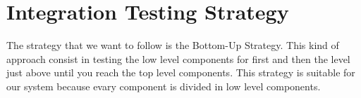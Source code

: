 \documentclass[../../../../testPlan.tex]{subfiles}
\begin{document}
	\section{Integration Testing Strategy}
		The strategy that we want to follow is the Bottom-Up Strategy. This kind of approach consist in testing the low level components for first and then the level just above until you reach the top level components.
		This strategy is suitable for our system because evary component is divided in low level components.
		
\end{document}
